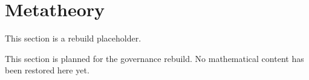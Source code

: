 \section{Metatheory}

\begin{tcolorbox}[colback=gray!6, colframe=gray!40, arc=2pt,
  left=6pt, right=6pt, top=4pt, bottom=4pt,
  title={\small\textbf{Metatheory Toolkit - Planned}},
  fonttitle=\small\bfseries]
This section is a rebuild placeholder.
\end{tcolorbox}

This section is planned for the governance rebuild. No mathematical content has
been restored here yet.
